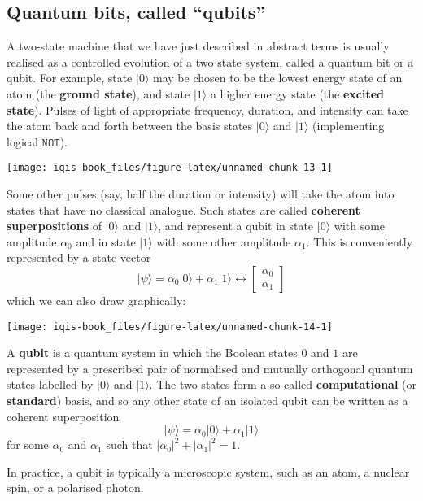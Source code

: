 \documentclass[fleqn]{article}
\newenvironment{idea}{\noindent}{\medskip}
\begin{document}
\hypertarget{quantum-bits-called-qubits}{%
\subsection{Quantum bits, called ``qubits''}\label{quantum-bits-called-qubits}}

A two-state machine that we have just described in abstract terms is usually realised as a controlled evolution of a two state system, called a quantum bit or a qubit.
For example, state \(|0\rangle\) may be chosen to be the lowest energy state of an atom (the \textbf{ground state}), and state \(|1\rangle\) a higher energy state (the \textbf{excited state}).
Pulses of light of appropriate frequency, duration, and intensity can take the atom back and forth between the basis states \(|0\rangle\) and \(|1\rangle\) (implementing logical \(\texttt{NOT}\)).

\begin{center}\texttt{[image: iqis-book\_files/figure-latex/unnamed-chunk-13-1]} \end{center}

Some other pulses (say, half the duration or intensity) will take the atom into states that have no classical analogue.
Such states are called \textbf{coherent superpositions} of \(|0\rangle\) and \(|1\rangle\), and represent a qubit in state \(|0\rangle\) with some amplitude \(\alpha_0\) and in state \(|1\rangle\) with some other amplitude \(\alpha_1\).
This is conveniently represented by a state vector
\[
    |\psi\rangle =
    \alpha_0|0\rangle + \alpha_1|1\rangle
    \leftrightarrow
    \begin{bmatrix}
      \alpha_0
    \\\alpha_1
    \end{bmatrix}
\]
which we can also draw graphically:

\begin{center}\texttt{[image: iqis-book\_files/figure-latex/unnamed-chunk-14-1]} \end{center}

\begin{idea}
A \textbf{qubit} is a quantum system in which the Boolean states \(0\) and \(1\) are represented by a prescribed pair of normalised and mutually orthogonal quantum states labelled by \(|0\rangle\) and \(|1\rangle\).
The two states form a so-called \textbf{computational} (or \textbf{standard}) basis, and so any other state of an isolated qubit can be written as a coherent superposition
\[
  |\psi\rangle = \alpha_0|0\rangle + \alpha_1|1\rangle
\]
for some \(\alpha_0\) and \(\alpha_1\) such that \(|\alpha_0|^2 + |\alpha_1|^2 = 1\).

In practice, a qubit is typically a microscopic system, such as an atom, a nuclear spin, or a polarised photon.

\end{idea}
\end{document}
